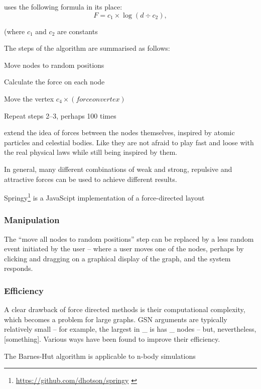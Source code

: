 \citeauthor{eades84} uses the following formula in its place:
$$
F = c_1 \times \log(d \div c_2),
$$

(where $c_1$ and $c_2$ are constants

The steps of the algorithm are summarised as follows:

\begin{enumerate*}
\item Move nodes to random positions
\item Calculate the force on each node
\item Move the vertex $c_4 \times (force on vertex)$
\item Repeat steps 2--3, perhaps 100 times
\end{enumerate*}



\citet{SPE:SPE4380211102} extend the idea of forces between the nodes themselves, inspired by atomic particles and celestial bodies. Like \citeauthor{eades84} they are not afraid to play fast and loose with the real physical laws while still being inspired by them. 

In general, many different combinations of weak and strong, repulsive and attractive forces can be used to achieve different results.

Springy\footnote{\url{https://github.com/dhotson/springy} \label{fn:springy}} is a JavaScipt implementation of a force-directed layout  

\subsubsection{Manipulation}

The ``move all nodes to random positions'' step can be replaced by a less random event initiated by the user -- where a user moves one of the nodes, perhaps by clicking and dragging on a graphical display of the graph, and the system responds.

\subsubsection{Efficiency}

A clear drawback of force directed methods is their computational complexity, which becomes a problem for large graphs.
GSN arguments are typically relatively small -- for example, the largest in \_ is has \_ nodes -- but, nevertheless, [something].
Various ways have been found to improve their efficiency.

The Barnes-Hut algorithm is applicable to n-body simulations \citet{quigleyfade} 

